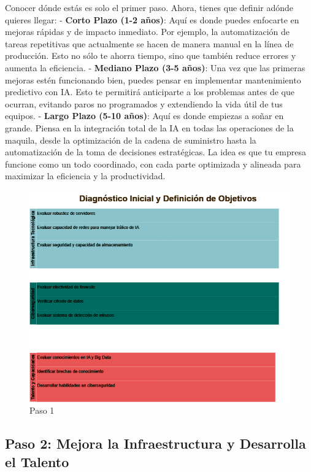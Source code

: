 \documentclass[
  10pt,
  letterpaper,
]{book}
\begin{document}
Conocer dónde estás es solo el primer paso. Ahora, tienes que definir
adónde quieres llegar: - \textbf{Corto Plazo (1-2 años)}: Aquí es donde
puedes enfocarte en mejoras rápidas y de impacto inmediato. Por ejemplo,
la automatización de tareas repetitivas que actualmente se hacen de
manera manual en la línea de producción. Esto no sólo te ahorra tiempo,
sino que también reduce errores y aumenta la eficiencia. -
\textbf{Mediano Plazo (3-5 años)}: Una vez que las primeras mejoras
estén funcionando bien, puedes pensar en implementar mantenimiento
predictivo con IA. Esto te permitirá anticiparte a los problemas antes
de que ocurran, evitando paros no programados y extendiendo la vida útil
de tus equipos. - \textbf{Largo Plazo (5-10 años)}: Aquí es donde
empiezas a soñar en grande. Piensa en la integración total de la IA en
todas las operaciones de la maquila, desde la optimización de la cadena
de suministro hasta la automatización de la toma de decisiones
estratégicas. La idea es que tu empresa funcione como un todo
coordinado, con cada parte optimizada y alineada para maximizar la
eficiencia y la productividad.

\begin{figure}[H]

{\centering \includegraphics{Img/paso1.png}

}

\caption{Paso 1}

\end{figure}%

\subsection{Paso 2: Mejora la Infraestructura y Desarrolla el
Talento}\label{paso-2-mejora-la-infraestructura-y-desarrolla-el-talento}
\end{document}
